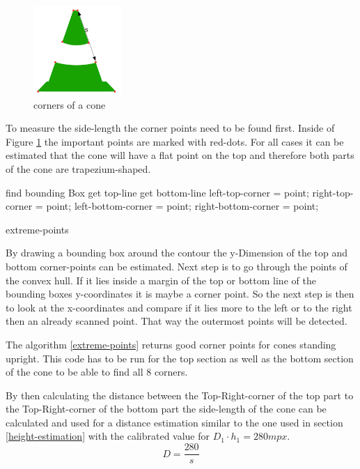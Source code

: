 \documentclass[10pt,a4paper]{article}
\begin{document}
	\begin{figure}[h]
		\centering
		\includegraphics[width=0.3\textwidth]{Abb/corners.png}
		\caption{corners of a cone}
		\label{corners}
	\end{figure}
	
	To measure the side-length the corner points need to be found first. Inside of Figure \ref{corners} the important points are marked with red-dots.
	For all cases it can be estimated that the cone will have a flat point on the top and therefore both parts of the cone are trapezium-shaped.

	\begin{algorithm}
		find bounding Box\;
		get top-line\; 
		get bottom-line\;
			{
				{
					{left-top-corner = point;}
					{right-top-corner = point;}
				}
				{
					{left-bottom-corner = point;}
					{right-bottom-corner = point;}
			}
		}
	\label{extreme-points}
	\caption{extreme-points} 
	\end{algorithm}

	By drawing a bounding box around the contour the y-Dimension of the top and bottom corner-points can be estimated. Next step is to go through the points of the convex hull. If it lies inside a margin of the top or bottom line of the bounding boxes y-coordinates it is maybe a corner point. So the next step is then to look at the x-coordinates and compare if it lies more to the left or to the right then an already scanned point. That way the outermost points will be detected.
	
	The algorithm \ref{extreme-points} returns good corner points for cones standing upright. This code has to be run for the top section as well as the bottom section of the cone to be able to find all 8 corners.
	 
	By then calculating the distance between the Top-Right-corner of the top part to the Top-Right-corner of the bottom part the side-length of the cone can be calculated and used for a distance estimation similar to the one used in section \ref{height-estimation} with the calibrated value for $D_1 \cdot h_1 = 280 \si{mpx}$.
	$$D=\frac{280}{s}$$
	
\end{document}
